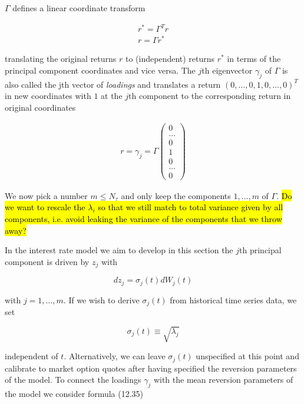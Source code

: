 \documentclass{amsart}
\theoremstyle{plain}
\numberwithin{equation}{section}
\begin{document}
$\Gamma$ defines a linear coordinate transform

\begin{eqnarray}\label{coordinate_transform}
r^* = \Gamma^T r \\
r = \Gamma r^*
\end{eqnarray}

translating the original returns $r$ to (independent) returns $r^*$ in terms of the principal component coordinates and
vice versa. The $j$th eigenvector $\gamma_j$ of $\Gamma$ is also called the jth vector of {\em loadings} and translates
a return $(0,\ldots,0,1,0,\ldots,0)^T$ in new coordinates with $1$ at the $j$th component to the corresponding return in
original coordinates

\begin{eqnarray}
  r = \gamma_j = \Gamma \begin{pmatrix}
    0 \\
    \ldots \\
    0 \\
    1 \\
    0 \\
    \ldots \\
    0
    \end{pmatrix}
\end{eqnarray}

We now pick a number $m \leq N_\tau$ and only keep the components $1,\ldots,m$ of $\Gamma$. \hl{Do we want to rescale
  the $\lambda_i$ so that we still match to total variance given by all components, i.e. avoid leaking the variance of
  the components that we throw away?}

In the interest rate model we aim to develop in this section the $j$th principal component is driven by $z_j$ with

\begin{equation}
dz_j = \sigma_j(t) dW_j(t)
\end{equation}

with $j=1,\ldots,m$. If we wish to derive $\sigma_j(t)$ from historical time series data, we set

\begin{equation}\label{hist_factor_vols}
\sigma_j(t) \equiv \sqrt{\lambda_j}
\end{equation}

independent of $t$. Alternatively, we can leave $\sigma_j(t)$ unspecified at this point and calibrate to market option
quotes after having specified the reversion parameters of the model. To connect the loadings $\gamma_j$ with the mean
reversion parameters of the model we consider \cite{Andersen_Piterbarg_2010} formula (12.35)
\end{document}
